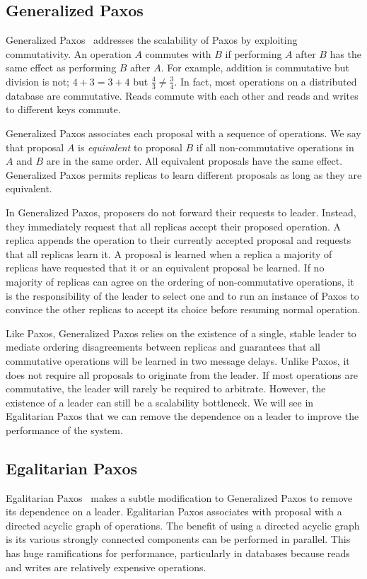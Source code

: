 \documentclass[../main.tex]{subfiles}
\begin{document}
  \subsection{Generalized Paxos}
  Generalized Paxos~\cite{generalized-paxos} addresses the scalability of Paxos by exploiting
  commutativity. An operation $A$ commutes with $B$ if performing $A$ after $B$ has the same effect
  as performing $B$ after $A$. For example, addition is commutative but division is not;
  $4 + 3 = 3 + 4$ but $\frac{4}{3} \ne \frac{3}{4}$. In fact, most operations on a distributed
  database are commutative. Reads commute with each other and reads and writes to different keys
  commute.

  Generalized Paxos associates each proposal with a sequence of operations. We say that proposal $A$
  is \emph{equivalent} to proposal $B$ if all non-commutative operations in $A$ and $B$ are in the
  same order. All equivalent proposals have the same effect. Generalized Paxos permits replicas to
  learn different proposals as long as they are equivalent.

  In Generalized Paxos, proposers do not forward their requests to leader. Instead, they immediately
  request that all replicas accept their proposed operation. A replica appends the operation to
  their currently accepted proposal and requests that all replicas learn it. A proposal is learned
  when a replica a majority of replicas have requested that it or an equivalent proposal be learned.
  If no majority of replicas can agree on the ordering of non-commutative operations, it is the
  responsibility of the leader to select one and to run an instance of Paxos to convince the other
  replicas to accept its choice before resuming normal operation.

  Like Paxos, Generalized Paxos relies on the existence of a single, stable leader to mediate
  ordering disagreements between replicas and guarantees that all commutative operations will be
  learned in two message delays. Unlike Paxos, it does not require all proposals to originate from
  the leader. If most operations are commutative, the leader will rarely be required to arbitrate.
  However, the existence of a leader can still be a scalability bottleneck. We will see in
  Egalitarian Paxos that we can remove the dependence on a leader to improve the performance of the
  system.

  \subsection{Egalitarian Paxos}
  Egalitarian Paxos~\cite{epaxos} makes a subtle modification to Generalized Paxos to remove its
  dependence on a leader. Egalitarian Paxos associates with proposal with a directed acyclic graph
  of operations. The benefit of using a directed acyclic graph is its various strongly connected
  components can be performed in parallel. This has huge ramifications for performance, particularly
  in databases because reads and writes are relatively expensive operations.
\end{document}
